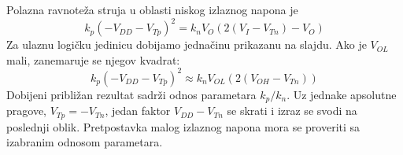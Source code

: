 Polazna ravnoteža struja u oblasti niskog izlaznog napona je
\[k_p(-V_{DD}-V_{Tp})^2=k_nV_O\left(2(V_I-V_{Tn})-V_O\right)\]
Za ulaznu logičku jedinicu dobijamo jednačinu prikazanu na slajdu. Ako je $V_{OL}$ mali, zanemaruje se njegov kvadrat:
\[k_p(-V_{DD}-V_{Tp})^2\approx k_nV_{OL}\left(2(V_{OH}-V_{Tn})\right)\]
Dobijeni približan rezultat sadrži odnos parametara $k_p/k_n$. Uz jednake apsolutne pragove, $V_{Tp}=-V_{Tn}$, jedan faktor $V_{DD}-V_{Tn}$ se skrati i izraz se svodi na poslednji oblik. Pretpostavka malog izlaznog napona mora se proveriti sa izabranim odnosom parametara.
